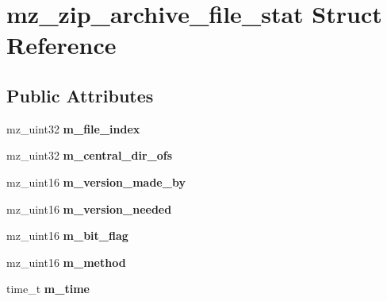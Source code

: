 \hypertarget{structmz__zip__archive__file__stat}{}\section{mz\+\_\+zip\+\_\+archive\+\_\+file\+\_\+stat Struct Reference}
\label{structmz__zip__archive__file__stat}
\subsection*{Public Attributes}
\begin{DoxyCompactItemize}
\item 
\mbox{\label{structmz__zip__archive__file__stat_a9a7f0737f031b23a29c58fc7ff2bd131}} 
mz\+\_\+uint32 {\bfseries m\+\_\+file\+\_\+index}
\item 
\mbox{\label{structmz__zip__archive__file__stat_aa2c98d69eb9a0302d8804d72f94ca541}} 
mz\+\_\+uint32 {\bfseries m\+\_\+central\+\_\+dir\+\_\+ofs}
\item 
\mbox{\label{structmz__zip__archive__file__stat_a3038faf9c1f24f2bf48eab9cc2b8ce8c}} 
mz\+\_\+uint16 {\bfseries m\+\_\+version\+\_\+made\+\_\+by}
\item 
\mbox{\label{structmz__zip__archive__file__stat_a0cfb77699313b855dcd1b5bed9dfb93a}} 
mz\+\_\+uint16 {\bfseries m\+\_\+version\+\_\+needed}
\item 
\mbox{\label{structmz__zip__archive__file__stat_ac9fdb10d21124d44be05ef0c04c1ad15}} 
mz\+\_\+uint16 {\bfseries m\+\_\+bit\+\_\+flag}
\item 
\mbox{\label{structmz__zip__archive__file__stat_ae1a9a8fbc09a4c3c14b04667d0f2d189}} 
mz\+\_\+uint16 {\bfseries m\+\_\+method}
\item 
\mbox{\label{structmz__zip__archive__file__stat_a18d1f5f9b03e906c40ecd707610a5869}} 
time\+\_\+t {\bfseries m\+\_\+time}
\item 
\mbox{\label{structmz__zip__archive__file__stat_af9fe260b684c70c1725a8b100cbd97a8}} 

\end{DoxyCompactItemize}
